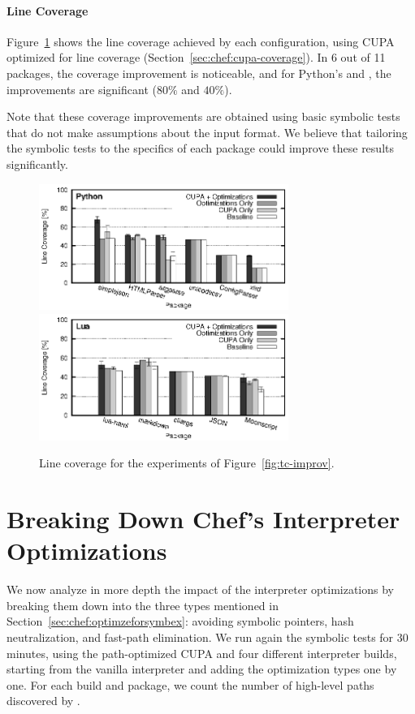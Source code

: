 \paragraph{Line Coverage}

Figure~\ref{fig:coverage-improv} shows the line coverage achieved by each configuration, using CUPA optimized for line coverage (Section~\ref{sec:chef:cupa-coverage}).  In 6 out of 11 packages, the coverage improvement is noticeable, and for Python's  and , the improvements are significant ($80\%$ and $40\%$).

Note that these coverage improvements are obtained using basic symbolic tests that do not make assumptions about the input format.  We believe that tailoring the symbolic tests to the specifics of each package could improve these results significantly.

\begin{figure}[t]
  \centering
  \includegraphics[width=3.2in]{figures/evaluation/bkdown-stmtcov-python} \\
  \includegraphics[width=3.2in]{figures/evaluation/bkdown-stmtcov-lua}
  \caption{Line coverage for the experiments of Figure~\ref{fig:tc-improv}.}
  \label{fig:coverage-improv}
\end{figure}

\section{Breaking Down Chef's Interpreter Optimizations}
\label{sec:sub:optimizations}

We now analyze in more depth the impact of the interpreter optimizations by breaking them down into the three types mentioned in Section~\ref{sec:chef:optimzeforsymbex}: avoiding symbolic pointers, hash neutralization, and fast-path elimination.  We run again the symbolic tests for 30 minutes, using the path-optimized CUPA and four different interpreter builds, starting from the vanilla interpreter and adding the optimization types one by one.  For each build and package, we count the number of high-level paths discovered by \chef.

